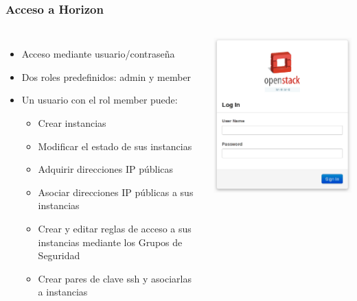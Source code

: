 \documentclass{beamer}
\begin{document}
\begin{frame}
  \frametitle{Acceso a Horizon}
  \begin{columns}
    \begin{itemize}
    \item Acceso mediante usuario/contraseña
    \item Dos roles predefinidos: admin y member
    \item Un usuario con el rol member puede:
      \begin{itemize}
      \item Crear instancias
      \item Modificar el estado de sus instancias
      \item Adquirir direcciones IP públicas
      \item Asociar direcciones IP públicas a sus instancias
      \item Crear y editar reglas de acceso a sus instancias mediante los Grupos
        de Seguridad 
      \item Crear pares de clave ssh y asociarlas a instancias
      \end{itemize}
    \end{itemize}
    \includegraphics[width=\columnwidth]{../img/horizon1.png}
  \end{columns}
\end{frame}
\end{document}
